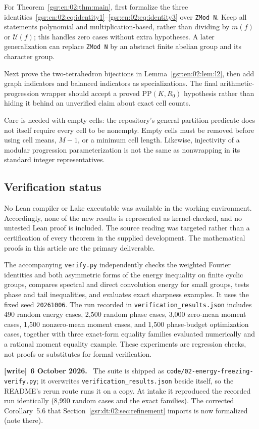 \documentclass[11pt,letterpaper]{article}
\numberwithin{equation}{section}
\theoremstyle{definition}
\theoremstyle{remark}
\newcommand{\1}{\mathbf 1}
\newcommand{\U}{\mathcal U}
\newcommand{\file}[1]{\nolinkurl{#1}}
\newenvironment{writenote}[1][]{\par\smallskip\begingroup\small
 \noindent\textbf{[write]}\if\relax\detokenize{#1}\relax\else~\textbf{#1.}\fi\ }%
 {\par\endgroup\smallskip}
\begin{document}
For Theorem~\ref{gsr:en:02:thm:main}, first formalize the three identities~\eqref{gsr:en:02:eq:identity1}--\eqref{gsr:en:02:eq:identity3} over \texttt{ZMod N}. Keep all statements polynomial and multiplication-based, rather than dividing by $m(f)$ or $\U(f)$; this handles zero cases without extra hypotheses. A later generalization can replace \texttt{ZMod N} by an abstract finite abelian group and its character group.

Next prove the two-tetrahedron bijections in Lemma~\ref{gsr:en:02:lem:l2}, then add graph indicators and balanced indicators as specializations. The final arithmetic-progression wrapper should accept a proved $\mathrm{PP}(K,R_0)$ hypothesis rather than hiding it behind an unverified claim about exact cell counts.

Care is needed with empty cells: the repository's general partition predicate does not itself require every cell to be nonempty. Empty cells must be removed before using cell means, $M-1$, or a minimum cell length. Likewise, injectivity of a modular progression parameterization is not the same as nonwrapping in its standard integer representatives.

\subsection{Verification status}
No Lean compiler or Lake executable was available in the working environment. Accordingly, none of the new results is represented as kernel-checked, and no untested Lean proof is included. The source reading was targeted rather than a certification of every theorem in the supplied development. The mathematical proofs in this article are the primary deliverable.

The accompanying \texttt{verify.py} independently checks the weighted Fourier identities and both asymmetric forms of the energy inequality on finite cyclic groups, compares spectral and direct convolution energy for small groups, tests phase and tail inequalities, and evaluates exact sharpness examples. It uses the fixed seed \texttt{20261006}. The run recorded in \texttt{verification\_results.json} includes 490 random energy cases, 2,500 random phase cases, 3,000 zero-mean moment cases, 1,500 nonzero-mean moment cases, and 1,500 phase-budget optimization cases, together with three exact-form equality families evaluated numerically and a rational moment equality example. These experiments are regression checks, not proofs or substitutes for formal verification.
\begin{writenote}[6 October 2026]
The suite is shipped as \file{code/02-energy-freezing-verify.py}; it overwrites \file{verification\_results.json} beside itself, so the README's rerun route runs it on a copy. At intake it reproduced the recorded run identically (8,990 random cases and the exact families). The corrected Corollary~5.6 that Section~\ref{gsr:dt:02:sec:refinement} imports is now formalized (note there).
\end{writenote}
\end{document}

